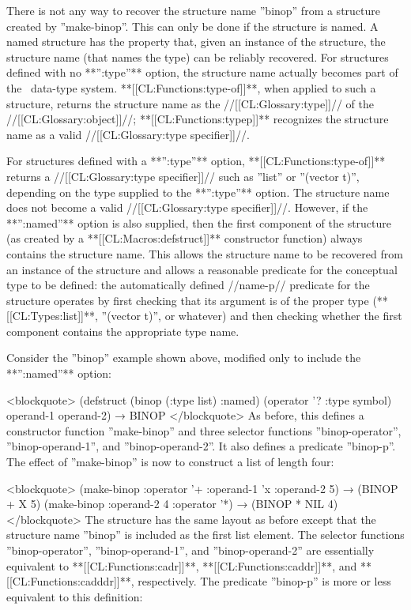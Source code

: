 There is not any way to recover the structure name ''binop'' from a structure created by ''make-binop''. This can only be done if the structure is named. A named structure has the property that, given an instance of the structure, the structure name (that names the type) can be reliably recovered. For structures defined with no **'':type''** option, the structure name actually becomes part of the \clisp\ data-type system. **[[CL:Functions:type-of]]**, when applied to such a structure, returns the structure name as the //[[CL:Glossary:type]]// of the //[[CL:Glossary:object]]//; **[[CL:Functions:typep]]** recognizes the structure name as a valid //[[CL:Glossary:type specifier]]//.

For structures defined with a **'':type''** option, **[[CL:Functions:type-of]]** returns a //[[CL:Glossary:type specifier]]// such as ''list'' or ''(vector t)'', depending on the type supplied to the **'':type''** option. The structure name does not become a valid //[[CL:Glossary:type specifier]]//. However, if the **'':named''** option is also supplied, then the first component of the structure (as created by a **[[CL:Macros:defstruct]]** constructor function) always contains the structure name. This allows the structure name to be recovered from an instance of the structure and allows a reasonable predicate for the conceptual type to be defined: the automatically defined //name-p// predicate for the structure operates by first checking that its argument is of the proper type (**[[CL:Types:list]]**, ''(vector t)'', or whatever) and then checking whether the first component contains the appropriate type name.

Consider the ''binop'' example shown above, modified only to include the **'':named''** option:

<blockquote> (defstruct (binop (:type list) :named) (operator '? :type symbol) operand-1 operand-2) → BINOP </blockquote> As before, this defines a constructor function ''make-binop'' and three selector functions ''binop-operator'', ''binop-operand-1'', and ''binop-operand-2''. It also defines a predicate ''binop-p''. The effect of ''make-binop'' is now to construct a list of length four:

<blockquote> (make-binop :operator '+ :operand-1 'x :operand-2 5) → (BINOP + X 5) (make-binop :operand-2 4 :operator '*) → (BINOP * NIL 4) </blockquote> The structure has the same layout as before except that the structure name ''binop'' is included as the first list element. The selector functions ''binop-operator'', ''binop-operand-1'', and ''binop-operand-2'' are essentially equivalent to **[[CL:Functions:cadr]]**, **[[CL:Functions:caddr]]**, and **[[CL:Functions:cadddr]]**, respectively. The predicate ''binop-p'' is more or less equivalent to this definition:

